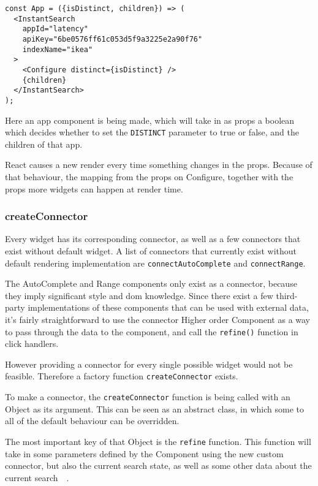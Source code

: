 \begin{minipage}{\linewidth}
\begin{lstlisting}[caption={Configure in an InstantSearch container},label={lst:ris-configure}]
const App = ({isDistinct, children}) => (
  <InstantSearch
    appId="latency"
    apiKey="6be0576ff61c053d5f9a3225e2a90f76"
    indexName="ikea"
  >
    <Configure distinct={isDistinct} />
    {children}
  </InstantSearch>
);
\end{lstlisting}
\end{minipage}

Here an app component is being made, which will take in as \gls{props} a boolean which decides whether to set the {\tt DISTINCT} parameter to true or false, and the children of that app.

React causes a new render every time something changes in the \gls{props}. Because of that behaviour, the mapping from the \gls{props} on Configure, together with the \gls{props} more widgets can happen at render time.

\subsubsection{createConnector}
\label{ssub:ris-createconnector}

Every widget has its corresponding connector, as well as a few connectors that exist without default widget. A list of connectors that currently exist without default rendering implementation are {\tt connectAutoComplete} and {\tt connectRange}.

The AutoComplete and Range components only exist as a connector, because they imply significant style and \acrshort{dom} knowledge. Since there exist a few third-party implementations of these components that can be used with external data, it's fairly straightforward to use the connector Higher order Component as a way to pass through the data to the component, and call the {\tt refine()} function in click handlers. 

However providing a connector for every single possible widget would not be feasible. Therefore a factory function {\tt createConnector} exists.

To make a connector, the {\tt createConnector} function is being called with an Object as its argument. This can be seen as an abstract class, in which some to all of the default behaviour can be overridden. 

The most important key of that Object is the {\tt refine} function. This function will take in some parameters defined by the Component using the new custom connector, but also the current search state, as well as some other data about the current search~\cite{react-instantsearch-custom-connectors}~.

